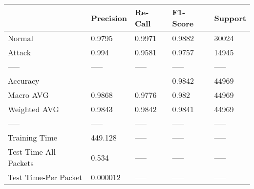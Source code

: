 \begin{tabular}{lllll}
\toprule
{} & Precision & Re-Call & F1-Score & Support \\
\midrule
Normal                &    0.9795 &  0.9971 &   0.9882 &   30024 \\
Attack                &     0.994 &  0.9581 &   0.9757 &   14945 \\
-----                 &     ----- &   ----- &    ----- &   ----- \\
Accuracy              &           &         &   0.9842 &   44969 \\
Macro AVG             &    0.9868 &  0.9776 &    0.982 &   44969 \\
Weighted AVG          &    0.9843 &  0.9842 &   0.9841 &   44969 \\
-----                 &     ----- &   ----- &    ----- &   ----- \\
Training Time         &   449.128 &   ----- &    ----- &   ----- \\
Test Time-All Packets &     0.534 &   ----- &    ----- &   ----- \\
Test Time-Per Packet  &  0.000012 &   ----- &    ----- &   ----- \\
\bottomrule
\end{tabular}
